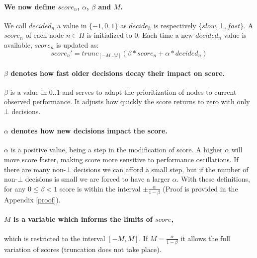 \paragraph{We now define $score_n$, $\alpha$, $\beta$ and $M$.}

We call $decided_n$ a value in $\{ -1, 0, 1 \}$ as $decide_h$ is respectively $\{ slow, \bot, fast \}$. 
A $score_n$ of each node $n \in \Pi$ is initialized to 0.
Each time a new $decided_n$ value is available, $score_n$ is updated as: 
\begin{equation} 
\label{eq.score}
score_n' = trunc_{[-M..M]}(\beta*score_n + \alpha*decided_n )
\end{equation}
%
\paragraph{$\beta$ denotes how fast older decisions decay their impact on score.}
$\beta$ is a value in $0..1$ 
and serves to adapt the prioritization of nodes to current observed performance.   It adjusts how quickly the score returns to zero with only $\bot$ decisions.

\paragraph{$\alpha$ denotes how new decisions impact the score.} 
$\alpha$ is a positive value, being a step in the modification of score. 
A higher $\alpha$ will move score faster, making score more sensitive to performance oscillations.   
If there are many non-$\bot$ decisions we can afford a small step, but if the number of non-$\bot$ decisions is small we are forced to have a larger $\alpha$. 
%
With these definitions, for any $0 \leq \beta < 1$  score is within the interval $\pm \frac{\alpha}{1-\beta}$ (Proof is provided in the Appendix \ref{proof}). 

\paragraph{$M$ is a variable which informs the limits of $score$,} which is restricted to the interval $[-M,M]$.   If $M = \frac{\alpha}{1-\beta}$ it allows the full variation of scores (truncation does not take place). 

